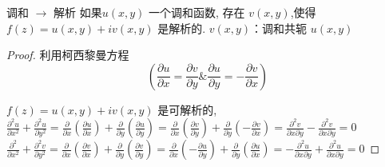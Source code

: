 \documentclass[cn,11pt,chinese,black]{elegantbook}
\begin{document}
	\begin{theorem}{调和 $\rightarrow$ 解析}
		\noindent 如果$u(x, y)$ 一个调和函数, 存在 $v(x, y)$,使得 $f(z)=u(x, y)+i v(x, y)$ 是解析的.
		$v(x, y)$：调和共轭 $u(x, y)$
	\end{theorem}
	\begin{proof}
		利用柯西黎曼方程$$ \left(\frac{\partial u}{\partial x}=\frac{\partial v}{\partial y} \& \frac{\partial u}{\partial y}=-\frac{\partial v}{\partial x}\right)$$ 
		
		$f(z)=u(x, y)+i v(x, y)$ 是可解析的, \\
		$\frac{\partial^{2} u}{\partial x^{2}}+\frac{\partial^{2} u}{\partial y^{2}}=\frac{\partial}{\partial x}\left(\frac{\partial u}{\partial x}\right)+\frac{\partial}{\partial y}\left(\frac{\partial u}{\partial y}\right)=\frac{\partial}{\partial x}\left(\frac{\partial v}{\partial y}\right)+\frac{\partial}{\partial y}\left(-\frac{\partial v}{\partial x}\right)=\frac{\partial^{2} v}{\partial x \partial y}-\frac{\partial^{2} v}{\partial x \partial y}=0$\\
		$\frac{\partial^{2}}{\partial x^{2}}+\frac{\partial^{2} v}{\partial y^{2}}=\frac{\partial}{\partial x}\left(\frac{\partial v}{\partial x}\right)+\frac{\partial}{\partial y}\left(\frac{\partial v}{\partial y}\right)=\frac{\partial}{\partial x}\left(-\frac{\partial u}{\partial y}\right)+\frac{\partial}{\partial y}\left(\frac{\partial u}{\partial x}\right)=-\frac{\partial^{2} u}{\partial x \partial y}+\frac{\partial^{2} u}{\partial x \partial y}=0$
	\end{proof}
	
\end{document}
